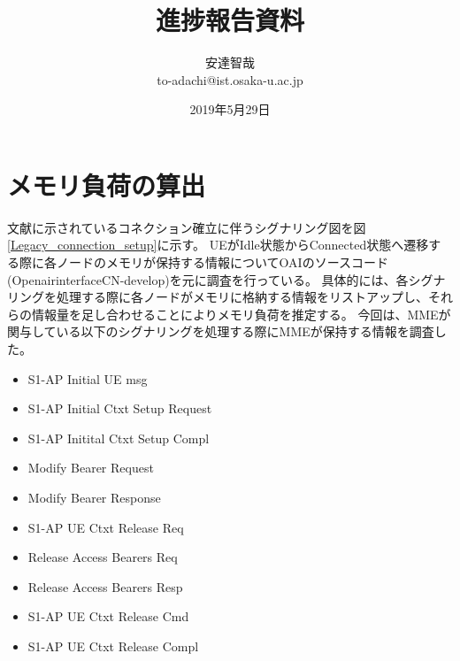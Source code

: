 \documentclass[a4j]{ujarticle}
\title{進捗報告資料}
\author{安達智哉\\to-adachi@ist.osaka-u.ac.jp}
\date{2019年5月29日}
\begin{document}
\maketitle


\section{メモリ負荷の算出}
文献\cite{3gpp.23.720}に示されているコネクション確立に伴うシグナリング図を図\ref{Legacy_connection_setup}に示す。
UEがIdle状態からConnected状態へ遷移する際に各ノードのメモリが保持する情報についてOAIのソースコード(OpenairinterfaceCN-develop)を元に調査を行っている。
具体的には、各シグナリングを処理する際に各ノードがメモリに格納する情報をリストアップし、それらの情報量を足し合わせることによりメモリ負荷を推定する。
今回は、MMEが関与している以下のシグナリングを処理する際にMMEが保持する情報を調査した。
\begin{itemize}
  \item S1-AP Initial UE msg
  \item S1-AP Initial Ctxt Setup Request
  \item S1-AP Initital Ctxt Setup Compl
  \item Modify Bearer Request
  \item Modify Bearer Response
  \item S1-AP UE Ctxt Release Req
  \item Release Access Bearers Req
  \item Release Access Bearers Resp
  \item S1-AP UE Ctxt Release Cmd
  \item S1-AP UE Ctxt Release Compl
\end{itemize}
\end{document}
